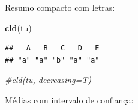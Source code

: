 \documentclass[
]{book}
\newenvironment{Shaded}{\begin{snugshade}}{\end{snugshade}}
\newcommand{\CommentTok}[1]{\textcolor[rgb]{0.56,0.35,0.01}{\textit{#1}}}
\newcommand{\DataTypeTok}[1]{\textcolor[rgb]{0.13,0.29,0.53}{#1}}
\newcommand{\KeywordTok}[1]{\textcolor[rgb]{0.13,0.29,0.53}{\textbf{#1}}}
\newcommand{\NormalTok}[1]{#1}
\newcommand{\OperatorTok}[1]{\textcolor[rgb]{0.81,0.36,0.00}{\textbf{#1}}}
\newcommand{\StringTok}[1]{\textcolor[rgb]{0.31,0.60,0.02}{#1}}
\begin{document}
Resumo compacto com letras:

\begin{Shaded}
\begin{Highlighting}[]
\KeywordTok{cld}\NormalTok{(tu)}
\end{Highlighting}
\end{Shaded}

\begin{verbatim}
##   A   B   C   D   E 
## "a" "a" "b" "a" "a"
\end{verbatim}

\begin{Shaded}
\begin{Highlighting}[]
\CommentTok{#cld(tu, decreasing=T)}
\end{Highlighting}
\end{Shaded}

Médias com intervalo de confiança:

\begin{Shaded}
\end{Shaded}
\end{document}

